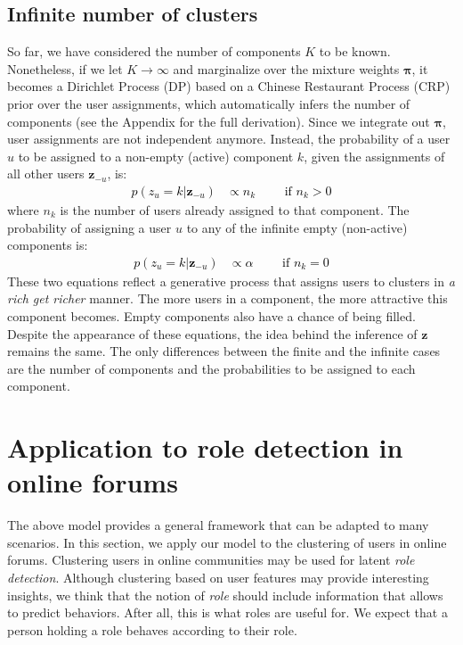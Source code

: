 \documentclass[smallextended]{svjour3}          %
\newcommand\alberto[1]{\textcolor{black}{#1}}
\begin{document}
\subsection{Infinite number of clusters}\label{sec:CRP}
So far, we have considered the number of components $K$ to be known. Nonetheless, if we let $K \rightarrow \infty$ and marginalize over the mixture weights $\boldsymbol{\pi}$, it becomes a Dirichlet Process (DP) based on a Chinese Restaurant Process (CRP) prior over the user assignments, which automatically infers the number of components (see the Appendix for the full derivation). Since we integrate out $\boldsymbol{\pi}$, user assignments are not independent anymore.
Instead, the probability of a user $u$ to be assigned to a non-empty (active) component $k$, given the assignments of all other users $\mathbf{z}_{-u}$, is:
\alberto{
\begin{align}
	p(z_u = k | \mathbf{z}_{-u}) &\propto n_k \qquad \text{ if } n_k > 0
\end{align}
}%
where $n_k$ is the number of users already assigned to that component. The probability of assigning a user $u$ to any of the infinite empty (non-active) components is: 
\alberto{
\begin{align}
	p(z_u = k | \mathbf{z}_{-u}) &\propto \alpha \qquad \text{ if } n_k = 0
\end{align}
}%
These two equations reflect a generative process that assigns users to clusters in \textit{a rich get richer} manner. The more users in a component, the more attractive this component becomes. Empty components also have a chance of being filled. 
Despite the appearance of these equations, the idea behind the inference of $\mathbf{z}$ remains the same. The only differences between the finite and the infinite cases are the number of components and the probabilities to be assigned to each component.



\section{Application to role detection in online forums}\label{sec:forums}

The above model provides a general framework that can be adapted to many scenarios. In this section, we apply our model to the clustering of users in online forums. Clustering users in online communities may be used for latent \textit{role detection}. Although clustering based on user features may provide interesting insights, we think that the notion of \textit{role} should include information that allows to predict behaviors. After all, this is what roles are useful for. We expect that a person holding a role behaves according to their role.
\end{document}
